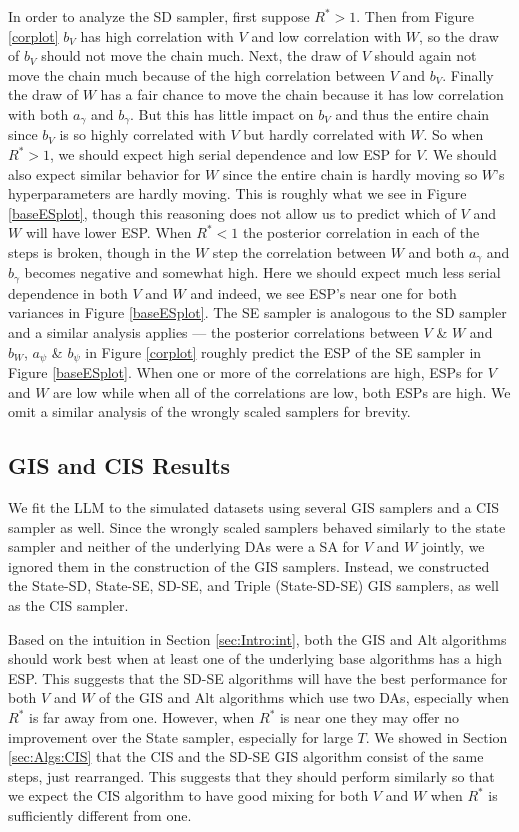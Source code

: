 \documentclass{article}
\begin{document}
In order to analyze the SD sampler, first suppose $R^*>1$. Then from Figure \ref{corplot} $b_V$ has high correlation with $V$ and low correlation with $W$, so the draw of $b_V$ should not move the chain much. Next, the draw of $V$ should again not move the chain much because of the high correlation between $V$ and $b_V$. Finally the draw of $W$ has a fair chance to move the chain because it has low correlation with both $a_\gamma$ and $b_\gamma$. But this has little impact on $b_V$ and thus the entire chain since $b_V$ is so highly correlated with $V$ but hardly correlated with $W$. So when $R^*>1$, we should expect high serial dependence and low ESP for $V$. We should also expect similar behavior for $W$ since the entire chain is hardly moving so $W$'s hyperparameters are hardly moving. This is roughly what we see in Figure \ref{baseESplot}, though this reasoning does not allow us to predict which of $V$ and $W$ will have lower ESP. When $R^*<1$ the posterior correlation in each of the steps is broken, though in the $W$ step the correlation between $W$ and both $a_\gamma$ and $b_\gamma$ becomes negative and somewhat high. Here we should expect much less serial dependence in both $V$ and $W$ and indeed, we see ESP's near one for both variances in Figure \ref{baseESplot}. The SE sampler is analogous to the SD sampler and a similar analysis applies --- the posterior correlations between $V$ \& $W$ and $b_W$, $a_\psi$ \& $b_\psi$ in Figure \ref{corplot} roughly predict the ESP of the SE sampler in Figure \ref{baseESplot}. When one or more of the correlations are high, ESPs for $V$ and $W$ are low while when all of the correlations are low, both ESPs are high. We omit a similar analysis of the wrongly scaled samplers for brevity.

\subsection{GIS and CIS Results}

We fit the LLM to the simulated datasets using several GIS samplers and a CIS sampler as well. Since the wrongly scaled samplers behaved similarly to the state sampler and neither of the underlying DAs were a SA for $V$ and $W$ jointly, we ignored them in the construction of the GIS samplers. Instead, we constructed the State-SD, State-SE, SD-SE, and Triple (State-SD-SE) GIS samplers, as well as the CIS sampler.

Based on the intuition in Section \ref{sec:Intro:int}, both the GIS and Alt algorithms should work best when at least one of the underlying base algorithms has a high ESP. This suggests that the SD-SE algorithms will have the best performance for both $V$ and $W$ of the GIS and Alt algorithms which use two DAs, especially when $R^*$ is far away from one. However, when $R^*$ is near one they may offer no improvement over the State sampler, especially for large $T$. We showed in Section \ref{sec:Algs:CIS} that the CIS and the SD-SE GIS algorithm consist of the same steps, just rearranged. This suggests that they should perform similarly so that we expect the CIS algorithm to have good mixing for both $V$ and $W$ when $R^*$ is sufficiently different from one. 
\end{document}
